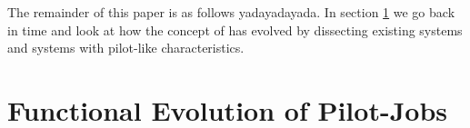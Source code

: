 \documentclass{sig-alternate}
\begin{document}
The remainder of this paper is as follows yadayadayada.
In section \ref{sec:history} we go back in time and look at how the concept of
\pilotjobs has evolved by dissecting existing \pilotjob systems and systems
with pilot-like characteristics.

\section{Functional Evolution of Pilot-Jobs}\label{sec:history}





\end{document}
